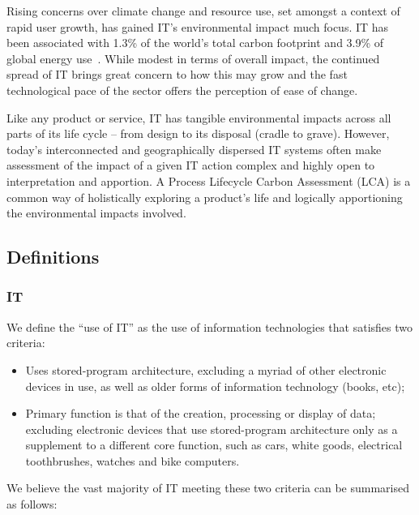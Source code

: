 \documentclass[conference]{IEEEtran}
\begin{document}
Rising concerns over climate change and resource use, set amongst a
context of rapid user growth, has gained IT's environmental impact
much focus. IT has been associated with 1.3\% of the world’s total
carbon footprint and 3.9\% of global energy
use~\cite{wheeland:2011}. While modest in terms of overall impact, the
continued spread of IT brings great concern to how this may grow and
the fast technological pace of the sector offers the perception of
ease of change.

Like any product or service, IT has tangible environmental impacts
across all parts of its life cycle -- from design to its disposal
(cradle to grave). However, today’s interconnected and geographically
dispersed IT systems often make assessment of the impact of a given IT
action complex and highly open to interpretation and apportion. A
Process Lifecycle Carbon Assessment (LCA) is a common way of
holistically exploring a product’s life and logically apportioning the
environmental impacts involved.

\subsection{Definitions}

\subsubsection{IT}

We define the ``use of IT'' as the use of information technologies
that satisfies two criteria:

\begin{itemize}
\item Uses stored-program architecture, excluding a myriad of other
  electronic devices in use, as well as older forms of information
  technology (books, etc);
\item Primary function is that of the creation, processing or display
  of data; excluding electronic devices that use stored-program
  architecture only as a supplement to a different core function, such
  as cars, white goods, electrical toothbrushes, watches and bike
  computers.
\end{itemize}

We believe the vast majority of IT meeting these two criteria can be
summarised as follows:
\end{document}
